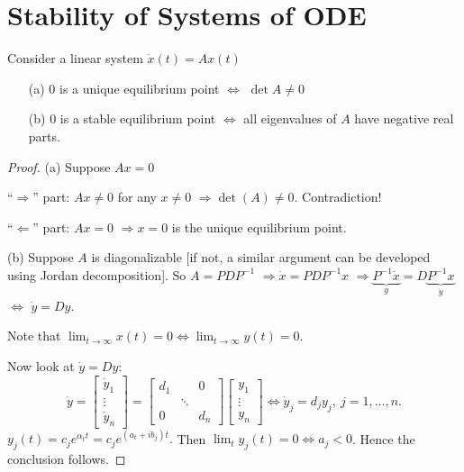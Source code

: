 \documentclass[twoside]{article}
\newcommand\imp{$\Longrightarrow$}
\begin{document}
\section{Stability of Systems of ODE}
\begin{theorem}
    Consider a linear system $\dot{x}(t) = A x (t)$
    \begin{enumerate}
        \item [(a)] 0 is a unique equilibrium point $\iff$ $\det A \neq 0$
        \item [(b)] 0 is a stable equilibrium point $\iff$ all eigenvalues of $A$ have negative real parts.
    \end{enumerate}
\end{theorem}
\begin{proof}
    (a) Suppose $Ax = 0$ 

    ``\imp'' part: $Ax \neq 0$ for any $x \neq 0$ \imp $\det(A) \neq 0$. Contradiction!

    ``$\Longleftarrow$'' part: $Ax = 0$ \imp $x=0$ is the unique equilibrium point.

    (b) Suppose $A$ is diagonalizable [if not, a similar argument can be developed using Jordan decomposition]. So $A = P D P^{-1}$ \imp $\dot{x} = P D P^{-1} x $ \imp $\underbrace{P^{-1} \dot{x}}_{y} = D \underbrace{ P^{-1} x}_{\dot{y}}$ $\iff$ $\dot{y} = D y$.

    Note that $\lim_{t \to \infty} x(t) = 0 \iff \lim_{t \to \infty} y(t) = 0 $.

    Now look at $\dot{y} = D y$:
    $$\dot{y} = \begin{bmatrix}
        \dot{y}_{1}\\
        \vdots\\
        \dot{y}_{n}
    \end{bmatrix} = 
    \begin{bmatrix}
        d_{1} & &0 \\
            & \ddots &\\
        0&& d_{n}
    \end{bmatrix}
    \begin{bmatrix}
        y_{1}\\
        \vdots\\
        y_{n}
    \end{bmatrix}
    \iff 
    \dot{y}_{j} = d_{j} y_{j}, ~ j = 1, ..., n.$$
    $y_{j}(t) = c_{j} e^{\alpha_{t} t} = c_{j} e^{(a_{t}+ i b_{j}) t}.$
    Then $\lim_t y_{j}(t) = 0 \iff a_{j} < 0 
    $. Hence the conclusion follows.
\end{proof}
\end{document}
